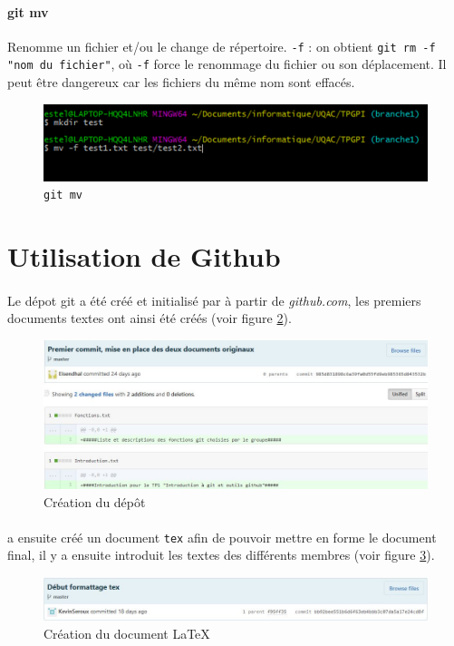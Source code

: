 \documentclass[11pt,canadien]{article}
\begin{document}
\paragraph{git mv}Renomme un fichier et/ou le change de répertoire. \texttt{-f} : on obtient \texttt{git rm -f "nom du fichier"}, où \texttt{-f} force le renommage du fichier ou son déplacement. Il peut être dangereux car les fichiers du même nom sont effacés.
\begin{figure}[h]
	\centering
	\includegraphics{images/git_mv_-f}
	\caption{\texttt{git mv}}
	\label{fig:git_mv}
\end{figure}

\FloatBarrier %
\section{Utilisation de Github}

\paragraph{}Le dépot git a été créé et initialisé par \joffrey à partir de \textit{github.com}, les premiers documents textes ont ainsi été créés (voir figure \ref{fig:InitDepot}).
\begin{figure}[h]
	\centering
	\includegraphics[width=\textwidth]{images/initialisation_depot.JPG}
	\caption{Création du dépôt}
	\label{fig:InitDepot}
\end{figure}

\paragraph{}\kevin a ensuite créé un document \texttt{tex} afin de pouvoir mettre en forme le document final, il y a ensuite introduit les textes des différents membres (voir figure \ref{fig:InitLatex}).
\begin{figure}[h]
	\centering
	\includegraphics[width=\textwidth]{images/initialisation_tex.JPG}
	\caption{Création du document \LaTeX}
	\label{fig:InitLatex}
\end{figure}
\end{document}
